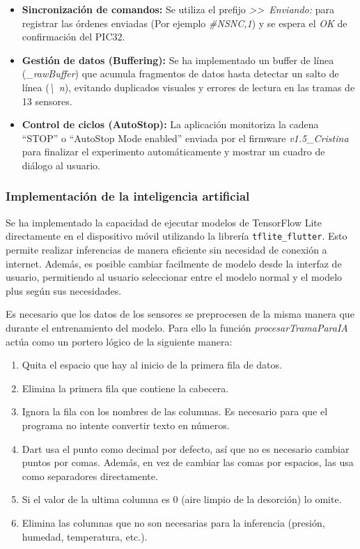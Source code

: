 \begin{itemize}
    \item \textbf{Sincronización de comandos:} Se utiliza el prefijo \textit{\textgreater\textgreater~Enviando:} para registrar las órdenes enviadas (Por ejemplo \textit{\#NSNC,1}) y se espera el \textit{OK} de confirmación del PIC32.
    \item \textbf{Gestión de datos (Buffering):} Se ha implementado un buffer de línea (\textit{\_rawBuffer}) que acumula fragmentos de datos hasta detectar un salto de línea (\textit{\textbackslash~n}), evitando duplicados visuales y errores de lectura en las tramas de 13 sensores.
    \item \textbf{Control de ciclos (AutoStop):} La aplicación monitoriza la cadena ``STOP'' o ``AutoStop Mode enabled'' enviada por el firmware \textit{v1.5\_Cristina} para finalizar el experimento automáticamente y mostrar un cuadro de diálogo al usuario.
\end{itemize}

\subsubsection{Implementación de la inteligencia artificial}
Se ha implementado la capacidad de ejecutar modelos de TensorFlow Lite directamente en el dispositivo móvil utilizando la librería \texttt{tflite\_flutter}. Esto permite realizar inferencias de manera eficiente sin necesidad de conexión a internet. Además, es posible cambiar facilmente de modelo desde la interfaz de usuario, permitiendo al usuario seleccionar entre el modelo normal y el modelo plus según sus necesidades.
\par

Es necesario que los datos de los sensores se preprocesen de la misma manera que durante el entrenamiento del modelo. Para ello la función \textit{procesarTramaParaIA} actúa como un portero lógico de la siguiente manera:

\begin{enumerate}
    \item Quita el espacio que hay al inicio de la primera fila de datos.
    \item Elimina la primera fila que contiene la cabecera.
    \item Ignora la fila con los nombres de las columnas. Es necesario para que el programa no intente convertir texto en números.
    \item Dart usa el punto como decimal por defecto, así que no es necesario cambiar puntos por comas. Además, en vez de cambiar las comas por espacios, las usa como separadores directamente.
    \item Si el valor de la ultima columna es 0 (aire limpio de la desorción) lo omite.
    \item Elimina las columnas que no son necesarias para la inferencia (presión, humedad, temperatura, etc.).
\end{enumerate}

